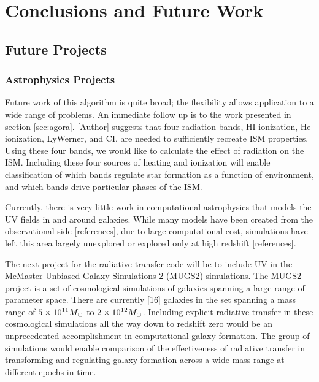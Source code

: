 \pagestyle{fancy}
\headheight 20pt
\chead{}
\lfoot{}
\cfoot{\thepage}
\rfoot{}
\renewcommand{\headrulewidth}{0.1pt}
\renewcommand{\footrulewidth}{0.1pt}

\chapter{Conclusions and Future Work}
\label{chap:conclusions}
\thispagestyle{fancy}


\section{Future Projects}
\label{sec:futurework}

\subsection{Astrophysics Projects}
\label{sec:astroprojects}

Future work of this algorithm is quite broad; the flexibility allows application to a wide range of problems. An immediate follow up is to the work presented in section \ref{sec:agora}. [Author] suggests that four radiation bands, HI ionization, He ionization, LyWerner, and CI, are needed to sufficiently recreate ISM properties. Using these four bands, we would like to calculate the effect of radiation on the ISM. Including these four sources of heating and ionization will enable classification of which bands regulate star formation as a function of environment, and which bands drive particular phases of the ISM.

Currently, there is very little work in computational astrophysics that models the UV fields in and around galaxies. While many models have been created from the observational side [references], due to large computational cost, simulations have left this area largely unexplored or explored only at high redshift [references].

The next project for the radiative transfer code will be to include UV in the McMaster Unbiased Galaxy Simulations 2 (MUGS2) simulations. The MUGS2 project is a set of cosmological simulations of galaxies spanning a large range of parameter space. There are currently [16] galaxies in the set spanning a mass range of $5\times 10^{11} M_{\odot}$ to $2\times 10^{12} M_{\odot}$. Including explicit radiative transfer in these cosmological simulations all the way down to redshift zero would be an unprecedented accomplishment in computational galaxy formation. The group of simulations would enable comparison of the effectiveness of radiative transfer in transforming and regulating galaxy formation across a wide mass range at different epochs in time.

